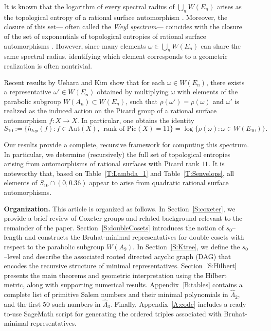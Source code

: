 \documentclass[11pt]{amsart}
\numberwithin{equation}{section}
\begin{document}
\medskip
It is known that the logarithm of every spectral radius of $\bigcup_n W(E_n)$ arises as the topological entropy of a rational surface automorphism \cite{Diller:2011, McMullen:2007, Uehara:2010, Kim:2023}. Moreover, the closure of this set--- often called the \emph{Weyl spectrum}--- coincides with the closure of the set of exponentials of topological entropies of rational surface automorphisms \cite{Diller-Favre:2001, blancdynamical}. However, since many elements $\omega \in \bigcup_n W(E_n)$ can share the same spectral radius, identifying which element corresponds to a geometric realization is often nontrivial. 

\medskip
Recent results by Uehara \cite{Uehara:2010} and Kim \cite[Theorem~B]{Kim:2023} show that for each $\omega \in W(E_n)$, there exists a representative $\omega' \in W(E_n)$ obtained by multiplying $\omega$ with elements of the parabolic subgroup $W(A_n) \subset W(E_n)$, such that $\rho(\omega') = \rho(\omega)$ and $\omega'$ is realized as the induced action on the Picard group of a rational surface automorphism $f:X \to X$. In particular, one obtains the identity
\[ S_{10}:=\{h_{top}(f) : f \in \text{Aut}(X),\ \  \text{rank of }\text{Pic}(X) = 11\} = \log \{\rho(\omega) : \omega \in W(E_{10})\}.\]

Our results provide a complete, recursive framework for computing this spectrum. In particular, we determine (recursively) the full set of topological entropies arising from automorphisms of rational surfaces with Picard rank $11$. It is noteworthy that, based on Table~\ref{T:Lambda_1} and Table~\ref{T:Senvelops}, all elements of  $S_{10} \cap (0,0.36) $ appear to arise from quadratic rational surface automorphisms. 

\medskip
\noindent\textbf{Organization.} This article is organized as follows. In Section~\ref{S:coxeter}, we provide a brief review of Coxeter groups and related background relevant to the remainder of the paper. Section~\ref{S:doubleCosets} introduces the notion of $s_0$--length and constructs the Bruhat-minimal representatives for double cosets with respect to the parabolic subgroup $W(A_9)$. In Section~\ref{S:Ktree}, we define the $s_0$--level and describe the associated rooted directed acyclic graph (DAG) that encodes the recursive structure of minimal representatives. Section~\ref{S:Hilbert} presents the main theorems and geometric interpretation using the Hilbert metric, along with supporting numerical results. Appendix~\ref{B:tables} contains a complete list of primitive Salem numbers and their minimal polynomials in $\hat \Lambda_2$, and the first 50 such numbers in $\hat \Lambda_3$. Finally, Appendix~\ref{A:code} includes a ready-to-use SageMath script for generating the ordered triples associated with Bruhat-minimal representatives.
\end{document}
